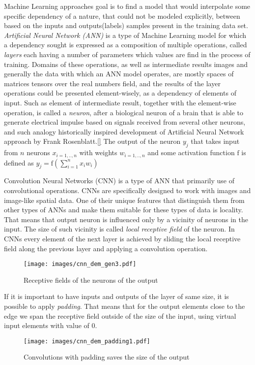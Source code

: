 Machine Learning approaches goal is to find a model that would interpolate some specific dependency of a nature, that could not be modeled explicitly, between based on the inputs and outputs(labels) samples present in the training data set.
\textit{Artificial Neural Network (ANN)} is a type of Machine Learning model for which a dependency sought is expressed as a composition of multiple operations, called \textit{layers} each having a number of parameters which values are find in the process of training.
Domains of these operations, as well as intermediate results images and generally the data with which an ANN model operates, are mostly spaces of matrices tensors over the real numbers field, and the results of the layer operations could be presented element-wisely, as a dependency of elements of input.
Such as element of intermediate result, together with the element-wise operation, is called a \textit{neuron}, after a biological neuron of a brain that is able to generate electrical impulse based on signals received from several other neurons, and such analogy historically inspired development of Artificial Neural Network approach by Frank Rosenblatt.\ref{}
The output of the neuron $y_{j}$ that takes input from $n$ neurons $x_{i=1,..,n}$ with weights $w_{i=1,..,n}$ and some activation function $\mathrm{f}$ is defined as $ y_{j}=\mathrm{f}(\sum_{i=1}^{n} x_{i}w_{i})$
\medskip
{}

Convolution Neural Networks (CNN) is a type of ANN that primarily use of convolutional operations.
CNNs are specifically designed to work with images and image-like spatial data.
One of their unique features that distinguish them from other types of ANNs and make them suitable for these types of data is locality.
That means that output neuron is influenced only by a vicinity of neurons in the input.
The size of such vicinity is called \textit{local receptive field} of the neuron.
In CNNs every element of the next layer is achieved by sliding the local receptive field along the previous layer and applying a convolution operation.
\begin{figure}
	\centering
	\texttt{[image: images/cnn\_dem\_gen3.pdf]}
	\caption{Receptive fields of the neurons of the output}
	\label{fig:rec_field_demo}
\end{figure}

If it is important to have inputs and outputs of the layer of same size, it is possible to apply \textit{padding}.
That means that for the output elements close to the edge we span the receptive field outside of the size of the input, using virtual input elements with value of $0$. 
\begin{figure}
	\centering
	\texttt{[image: images/cnn\_dem\_padding1.pdf]}
	\caption{Convolutions with padding saves the size of the output}
	\label{fig:padding_demo}
\end{figure}
\medskip

